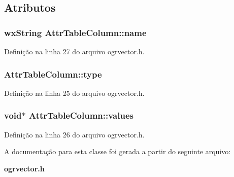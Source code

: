 \subsection{Atributos}
\subsubsection[{name}]{\setlength{\rightskip}{0pt plus 5cm}wx\+String Attr\+Table\+Column\+::name}\label{class_attr_table_column_a8329df65040abb66b0ffe198f0484384}


Definição na linha 27 do arquivo ogrvector.\+h.

\subsubsection[{type}]{ Attr\+Table\+Column\+::type}\label{class_attr_table_column_ad23a8f06ce0057c7de713c14c7afbd9c}


Definição na linha 25 do arquivo ogrvector.\+h.

\subsubsection[{values}]{\setlength{\rightskip}{0pt plus 5cm}void$\ast$ Attr\+Table\+Column\+::values}\label{class_attr_table_column_a95df81e4a97e1124d6258b3a06aea614}


Definição na linha 26 do arquivo ogrvector.\+h.



A documentação para esta classe foi gerada a partir do seguinte arquivo\+:\begin{DoxyCompactItemize}
\item 
{\bf ogrvector.\+h}\end{DoxyCompactItemize}
